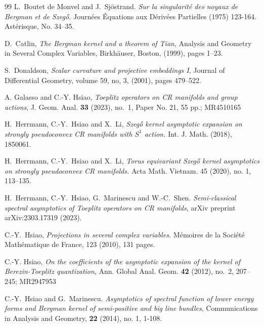 \documentclass[12pt]{amsart}
\theoremstyle{definition}
\theoremstyle{named}
\numberwithin{equation}{subsection}
\begin{document}
    

\begin{thebibliography}{99} 
L.~Boutet de Monvel and J.~Sj{\"o}strand. \emph{{Sur la singularit\'{e} des noyaux de Bergman et de Szeg\H{o}}.} {Journ{\'e}es {\'E}quations aux D{\'e}riv{\'e}es Partielles} (1975) 123-164. Ast\'{e}risque, No. 34--35. 

D.~Catlin, \emph{The Bergman kernel and a theorem of Tian},
Analysis and Geometry in Several Complex Variables, Birkh\"auser, Boston, (1999), pages 1--23. 

  S.~Donaldson, \emph{Scalar curvature and projective embeddings I},
Journal of Differential Geometry, volume 59, no, 3, (2001), pages 479--522. 

A. Galasso and C.-Y. Hsiao, \emph{Toeplitz operators on CR manifolds and group actions}, J. Geom. Anal. {\bf 33} (2023), no.~1, Paper No. 21, 55 pp.; MR4510165 

H.~Herrmann, C.-Y.~Hsiao and X.~Li, \emph{{Szeg\H{o} kernel asymptotic expansion on strongly pseudoconvex CR manifolds with \(S^1\) action.
}} Int. J. Math. (2018), 1850061.

H.~Herrmann, C.-Y.~Hsiao and X.~Li, \emph{{Torus equivariant Szeg\H{o} kernel asymptotics on strongly pseudoconvex CR manifolds.
}} Acta Math. Vietnam. 45 (2020), no. 1, 113–135.

H.~Herrmann, C.-Y.~Hsiao, G.~Marinescu and W.-C.~Shen.
\emph{Semi-classical spectral asymptotics of Toeplitz operators on CR manifolds},  arXiv preprint arXiv:2303.17319 (2023). 

C.-Y.~Hsiao,
\emph{{Projections in several complex variables.}} Mémoires de la Société Mathématique de France, 123 (2010), 131 pages. 

C.-Y. Hsiao, \emph{On the coefficients of the asymptotic expansion of the kernel of Berezin-Toeplitz quantization}, Ann. Global Anal. Geom. {\bf 42} (2012), no.~2, 207--245; MR2947953 

C.-Y.~Hsiao and G.~Marinescu.
\emph{Asymptotics of spectral function of lower energy forms 
and Bergman kernel of semi-positive and big line bundles},
Communications in Analysis and Geometry, {\bf 22} (2014), no. 1, 1-108. 


\end{thebibliography}
\end{document}
